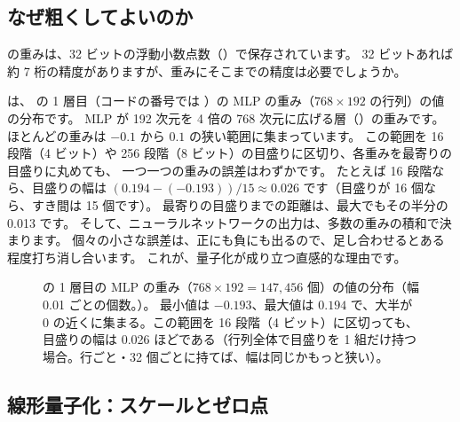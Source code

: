 \subsection{なぜ粗くしてよいのか}\label{sec:distill-quant-why}

 の重みは、32 ビットの浮動小数点数（）で保存されています。
32 ビットあれば約 7 桁の精度がありますが、重みにそこまでの精度は必要でしょうか。

は、 の 1 層目（コードの番号では ）の MLP の重み（$768\times192$ の行列）の値の分布です。
MLP が 192 次元を 4 倍の 768 次元に広げる層（）の重みです。
ほとんどの重みは $-0.1$ から $0.1$ の狭い範囲に集まっています。
この範囲を 16 段階（4 ビット）や 256 段階（8 ビット）の目盛りに区切り、各重みを最寄りの目盛りに丸めても、
一つ一つの重みの誤差はわずかです。
たとえば 16 段階なら、目盛りの幅は $(0.194-(-0.193))/15\approx0.026$ です（目盛りが 16 個なら、すき間は 15 個です）。
最寄りの目盛りまでの距離は、最大でもその半分の 0.013 です。
そして、ニューラルネットワークの出力は、多数の重みの積和で決まります。
個々の小さな誤差は、正にも負にも出るので、足し合わせるとある程度打ち消し合います。
これが、量子化が成り立つ直感的な理由です。

\begin{figure}[tbp]
\centering
{}
\caption{ の 1 層目の MLP の重み（$768\times192=147{,}456$ 個）の値の分布（幅 0.01 ごとの個数。）。
最小値は $-0.193$、最大値は $0.194$ で、大半が 0 の近くに集まる。この範囲を 16 段階（4 ビット）に区切っても、目盛りの幅は 0.026 ほどである（行列全体で目盛りを 1 組だけ持つ場合。行ごと・32 個ごとに持てば、幅は同じかもっと狭い）。}
\label{fig:quant-hist}
\end{figure}


\subsection{線形量子化：スケールとゼロ点}\label{sec:distill-quant-linear}

